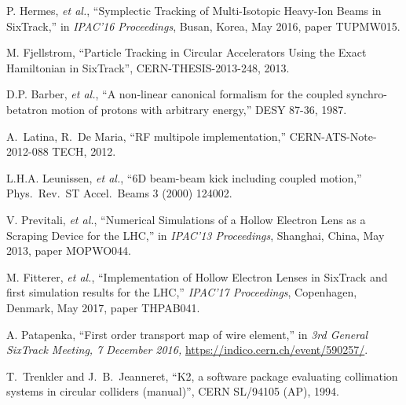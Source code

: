 \documentclass[a4paper,
              ]{jacow}
\begin{document}
\begin{thebibliography}{99}
 P. Hermes, {\it et al.}, ``Symplectic Tracking of Multi-Isotopic Heavy-Ion Beams in SixTrack,'' in \textit{IPAC'16 Proceedings}, Busan, Korea, May 2016, paper TUPMW015.


M. Fjellstrom, ``Particle Tracking in Circular Accelerators Using the
Exact Hamiltonian in SixTrack'', CERN-THESIS-2013-248, 2013.

D.P. Barber, {\it et al.},
``A non-linear canonical formalism for the coupled synchro-betatron
motion of protons with arbitrary energy,''
DESY 87-36, 1987.

A.~Latina, R.~De Maria, ``RF multipole implementation,''
CERN-ATS-Note-2012-088 TECH, 2012.

L.H.A. Leunissen, {\it et al.},
``6D beam-beam kick including coupled motion,''
Phys.\ Rev.\ ST Accel.\ Beams {3} (2000) 124002.

V. Previtali, {\it et al.},
``Numerical Simulations of a Hollow Electron Lens as a Scraping Device for the
LHC,'' in \textit{IPAC'13 Proceedings}, Shanghai, China, May 2013, paper MOPWO044.


M. Fitterer, {\it et al.},
``Implementation of Hollow Electron Lenses in SixTrack and first simulation results for the LHC,''
\textit{IPAC'17 Proceedings}, Copenhagen, Denmark, May 2017, paper THPAB041.



A. Patapenka, ``First order transport map of wire element,''
in \textit{3rd General SixTrack Meeting, 7 December 2016,}
\url{https://indico.cern.ch/event/590257/}.


T.~Trenkler and J.~B.~Jeanneret, ``K2, a software package evaluating collimation
systems in circular colliders (manual)'', CERN SL/94105 (AP), 1994.


\end{thebibliography}
\end{document}
